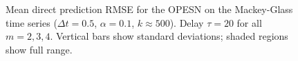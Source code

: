 \begin{figure}
    \centering




    \caption{Mean direct prediction RMSE for the OPESN on the Mackey-Glass time series ($\Delta t = 0.5$, $\alpha=0.1$, $k\approx500$). Delay $\tau=20$ for all $m=2,3,4$. Vertical bars show standard deviations; shaded regions show full range.}
    \label{fig:OPESN_mg_direct}
\end{figure}

